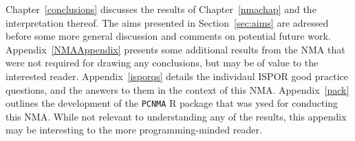 Chapter~\ref{conclusions} discusses the results of Chapter~\ref{nmachap} and the interpretation thereof. The aims presented in Section~\ref{sec:aims} are adressed before some more general discussion and comments on potential future work. \\

Appendix~\ref{NMAAppendix} presents some additional results from the NMA that were not required for drawing any conclusions, but may be of value to the interested reader. Appendix~\ref{isporqs} details the individaul ISPOR good practice questions, and the answers to them in the context of this NMA. Appendix~\ref{pack} outlines the development of the \verb|PCNMA| R package that was ysed for conducting this NMA. While not relevant to understanding any of the results, this appendix may be interesting to the more programming-minded reader.
